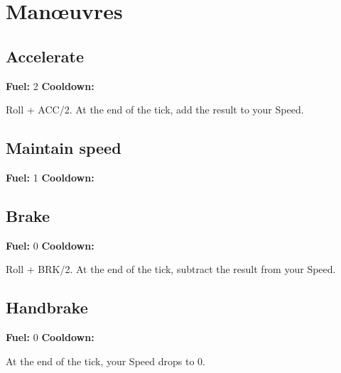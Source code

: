 \documentclass[10pt, a4paper, twocolumn]{article}
\begin{document}
\section{Man\oe{}uvres}
\newcommand{\manoeuvre}[4]{
\subsection{#1}
\textbf{Fuel:} #2 \hspace{2ex} \textbf{Cooldown:} \duration{#3}

#4
}

\manoeuvre{Accelerate}{2}{1}{Roll  + ACC/2. At the end of the tick, add the result to your Speed.}
\manoeuvre{Maintain speed}{1}{1}{}
\manoeuvre{Brake}{0}{2}{Roll  + BRK/2. At the end of the tick, subtract the result from your Speed.}
\manoeuvre{Handbrake}{0}{8}{At the end of the tick, your Speed drops to 0.}
\end{document}
